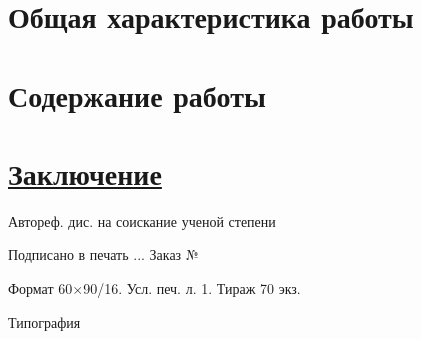 \documentclass[a5paper,10pt,twoside,openany,article]{memoir} %
\begin{document}
% 
% 
\mainmatter*                  %


\section*{Общая характеристика работы}





\section*{Содержание работы}




\section*{\underline{Заключение}}


\insertbiblioauthorgrouped



\newpage\thispagestyle{empty}

\vspace*{0pt plus1fill}

\small
\begin{center}
    \textit{\thesisAuthor}
    \par\medskip

    \thesisTitle
    \par\medskip

    Автореф. дис. на соискание ученой степени \thesisDegreeShort
    \par\bigskip

    Подписано в печать \blank[\widthof{999}].\blank[\widthof{999}].\blank[\widthof{99999}].
    Заказ № \blank[\widthof{999999999999}]

    Формат 60\(\times\)90/16. Усл. печ. л. 1. Тираж 70 экз.

    Типография \blank[0.5\linewidth]
\end{center}
\cleardoublepage
\end{document}

